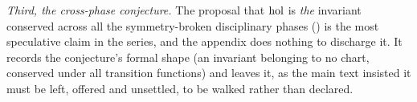 \emph{Third, the cross-phase conjecture.} The proposal that $\operatorname{hol}$ is \emph{the} invariant conserved across all the symmetry-broken disciplinary phases () is the most speculative claim in the series, and the appendix does nothing to discharge it. It records the conjecture's formal shape (an invariant belonging to no chart, conserved under all transition functions) and leaves it, as the main text insisted it must be left, offered and unsettled, to be walked rather than declared.
